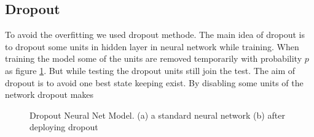 \subsection{Dropout}
To avoid the overfitting we used dropout methode\cite{srivastava2014dropout }. The main idea of dropout is to dropout some units in hidden layer in neural network while training. When training the model some of the units are removed temporarily with probability $p$ as figure \ref{fig:Dropout}.  But while testing the dropout units still join the test. The aim of dropout is to avoid one best state keeping exist. By disabling some units of the network dropout makes  
\begin{figure}[!h]

  \centering


\caption{Dropout Neural Net Model. (a) a standard neural network (b) after deploying dropout  }
\label{fig:Dropout}
\end{figure}

\newpage
